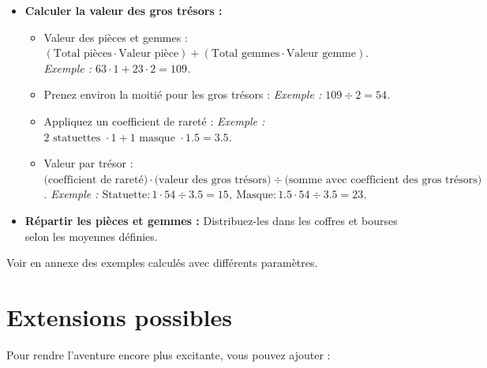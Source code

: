 \documentclass{pirategame}
\begin{document}
\begin{itemize}
  \item \textbf{Calculer la valeur des gros trésors :}
  \begin{itemize}
    \item Valeur des pièces et gemmes : \((\text{Total pièces} \cdot \text{Valeur pièce}) + (\text{Total gemmes} \cdot \text{Valeur gemme})\).  
    \textit{Exemple : \(63 \cdot 1 + 23 \cdot 2 = 109\).}
    \item Prenez environ la moitié pour les gros trésors :  
    \textit{Exemple : \(109 \div 2 = 54\).}
    \item Appliquez un coefficient de rareté :  
    \textit{Exemple : \(2 \text{ statuettes } \cdot 1 + 1 \text{ masque } \cdot 1.5 = 3.5\).}
    \item Valeur par trésor : \(\text{(coefficient de rareté)} \cdot \text{(valeur des gros trésors)} \div \text{(somme avec coefficient des gros trésors)}\).
    \textit{Exemple : \(\text{Statuette} : 1 \cdot 54 \div 3.5 = 15\), \(\text{Masque} : 1.5 \cdot 54 \div 3.5 = 23\).}
  \end{itemize}

  \item \textbf{Répartir les pièces et gemmes :}  
  Distribuez-les dans les coffres et bourses selon les moyennes définies.

\end{itemize}

Voir en annexe des exemples calculés avec différents paramètres.

\section{Extensions possibles}

Pour rendre l'aventure encore plus excitante, vous pouvez ajouter :
\end{document}
